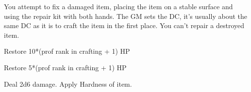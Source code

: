 


You attempt to fix a damaged item, placing the item on a stable surface and using the repair kit with both hands.
The GM sets the DC, it's usually about the same DC as it is to craft the item in the first place.
You can't repair a destroyed item.

 Restore 10*(prof rank in crafting + 1) HP

 Restore 5*(prof rank in crafting + 1) HP

 Deal 2d6 damage. Apply Hardness of item.


\vfill

\hfill{}

